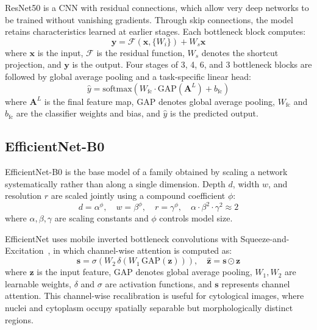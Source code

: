\documentclass[runningheads]{llncs}
\begin{document}
ResNet50 \cite{he2016deep} is a CNN with residual connections, which allow very deep networks to be trained without vanishing gradients. Through skip connections, the model retains characteristics learned at earlier stages. Each bottleneck block computes:
\begin{equation}
    \mathbf{y} = \mathcal{F}(\mathbf{x},\{W_i\}) + W_s\mathbf{x}
    \label{eq:resnet}
\end{equation}
where $\mathbf{x}$ is the input, $\mathcal{F}$ is the residual function, $W_s$ denotes the shortcut projection, and $\mathbf{y}$ is the output. Four stages of 3, 4, 6, and 3 bottleneck blocks are followed by global average pooling and a task-specific linear head:
\begin{equation}
    \hat{y} = \mathrm{softmax}\left(W_{\mathrm{fc}} \cdot \mathrm{GAP}(\mathbf{A}^L) + b_{\mathrm{fc}}\right)
\end{equation}
where $\mathbf{A}^L$ is the final feature map, $\mathrm{GAP}$ denotes global average pooling, $W_{\mathrm{fc}}$ and $b_{\mathrm{fc}}$ are the classifier weights and bias, and $\hat{y}$ is the predicted output.

\subsection{EfficientNet-B0}

EfficientNet-B0 \cite{tan2019efficientnet} is the base model of a family obtained by scaling a network systematically rather than along a single dimension. Depth $d$, width $w$, and resolution $r$ are scaled jointly using a compound coefficient $\phi$:
\begin{equation}
    d = \alpha^\phi,\quad w = \beta^\phi,\quad r = \gamma^\phi,\quad
    \alpha \cdot \beta^2 \cdot \gamma^2 \approx 2
    \label{eq:effnet}
\end{equation}
where $\alpha, \beta, \gamma$ are scaling constants and $\phi$ controls model size.

EfficientNet uses mobile inverted bottleneck convolutions with Squeeze-and-Excitation~\cite{hu2018senet}, in which channel-wise attention is computed as:
\begin{equation}
    \mathbf{s} = \sigma(W_2\,\delta(W_1\,\mathrm{GAP}(\mathbf{z}))), \quad
    \hat{\mathbf{z}} = \mathbf{s} \odot \mathbf{z}
    \label{eq:se}
\end{equation}
where $\mathbf{z}$ is the input feature, $\mathrm{GAP}$ denotes global average pooling, $W_1, W_2$ are learnable weights, $\delta$ and $\sigma$ are activation functions, and $\mathbf{s}$ represents channel attention. This channel-wise recalibration is useful for cytological images, where nuclei and cytoplasm occupy spatially separable but morphologically distinct regions.
\end{document}
